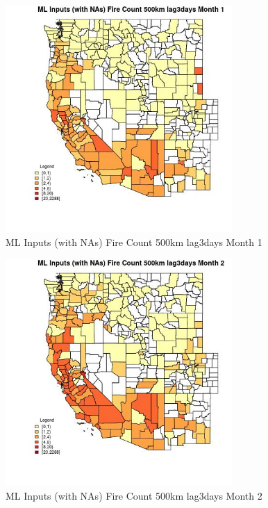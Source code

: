 \clearpage 

\begin{figure} 
\centering  
\includegraphics[width=0.77\textwidth]{Code_Outputs/Report_ML_input_PM25_Step4_part_e_de_duplicated_aves_compiled_2019-05-20wNAs_CountyFire_Count_500km_lag3daysmedianMonth1.jpg} 
\caption{\label{fig:Report_ML_input_PM25_Step4_part_e_de_duplicated_aves_compiled_2019-05-20wNAsCountyFire_Count_500km_lag3daysmedianMonth1}ML Inputs (with NAs) Fire Count 500km lag3days Month 1} 
\end{figure} 
 

\begin{figure} 
\centering  
\includegraphics[width=0.77\textwidth]{Code_Outputs/Report_ML_input_PM25_Step4_part_e_de_duplicated_aves_compiled_2019-05-20wNAs_CountyFire_Count_500km_lag3daysmedianMonth2.jpg} 
\caption{\label{fig:Report_ML_input_PM25_Step4_part_e_de_duplicated_aves_compiled_2019-05-20wNAsCountyFire_Count_500km_lag3daysmedianMonth2}ML Inputs (with NAs) Fire Count 500km lag3days Month 2} 
\end{figure} 
 

